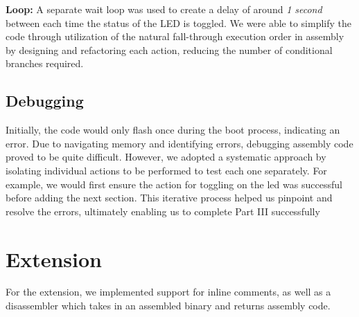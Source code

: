 \documentclass{article}
\begin{document}
\begin{adjustwidth}{2em}{0pt}
            \textbf{Loop: }A separate wait loop was used to create a delay of around \textit{1 second} between each time the status of the LED is toggled. We were able to simplify the code through utilization of the natural fall-through execution order in assembly by designing and refactoring each action, reducing the number of conditional branches required.
    
        \newpage
        
        \subsection{Debugging}
    
            Initially, the code would only flash once during the boot process, indicating an error. Due to navigating memory and identifying errors, debugging assembly code proved to be quite difficult. However, we adopted a systematic approach by isolating individual actions to be performed to test each one separately. For example, we would first ensure the action for toggling on the led was successful before adding the next section. This iterative process helped us pinpoint and resolve the errors, ultimately enabling us to complete Part III successfully
        
        \end{adjustwidth}
    
    \section{Extension}

        For the extension, we implemented support for inline comments, as well as a disassembler which takes in an assembled binary and returns assembly code.
        
\end{document}

